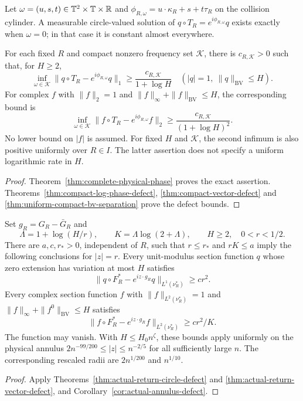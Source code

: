 \begin{maintheorem}
\label{thm:intro-quantitative-phases}
Let $\omega=(u,s,t)\in\mathbb T^2\times\mathbb T\times\mathbb R$ and
$\phi_{R,\omega}=u\cdot\kappa_R+s+t\tau_R$ on the collision cylinder.
A measurable circle-valued solution of
$q\circ T_R=e^{i\phi_{R,\omega}}q$ exists exactly when $\omega=0$;
in that case it is constant almost everywhere.

For each fixed $R$ and compact nonzero frequency set $\mathcal K$,
there is $c_{R,\mathcal K}>0$ such that, for $H\ge2$,
\[
 \inf_{\omega\in\mathcal K}
 \|q\circ T_R-e^{i\phi_{R,\omega}}q\|_1
                  \ge\frac{c_{R,\mathcal K}}{1+\log H}
 \quad (|q|=1,\ \|q\|_{\mathrm{BV}}\le H).
\]
For complex $f$ with $\|f\|_2=1$ and
$\|f\|_\infty+\|f\|_{\mathrm{BV}}\le H$, the corresponding bound is
\[
 \inf_{\omega\in\mathcal K}
 \|f\circ T_R-e^{i\phi_{R,\omega}}f\|_2
                  \ge\frac{c_{R,\mathcal K}}{(1+\log H)^2}.
\]
No lower bound on $|f|$ is assumed. For fixed $H$ and $\mathcal K$,
the second infimum is also positive uniformly over $R\in I$.
The latter assertion does not specify a uniform logarithmic rate in $H$.
\end{maintheorem}
\begin{proof}
Theorem~\ref{thm:complete-physical-phase} proves the exact assertion.
Theorems~\ref{thm:compact-log-phase-defect},
\ref{thm:compact-vector-defect} and
\ref{thm:uniform-compact-bv-separation} prove the defect bounds.
\end{proof}

\begin{maintheorem}
\label{thm:intro-actual-return-defects}
Set $g_R=G_R-\bar G_R$ and
\[
 \Lambda=1+\log(H/r),\qquad K=\Lambda\log(2+\Lambda),
                 \qquad H\ge2,\quad 0<r<1/2.
\]
There are $a,c,r_*>0$, independent of $R$, such that $r\le r_*$
and $rK\le a$ imply the following conclusions for $|z|=r$.
Every unit-modulus section function $q$ whose zero extension has
variation at most $H$ satisfies
\[
 \|q\circ F_R^*-e^{iz\cdot g_R}q\|_{L^1(\nu_R^*)}\ge cr^2.
\]
Every complex section function $f$ with
$\|f\|_{L^2(\nu_R^*)}=1$ and
$\|f\|_\infty+\|f^0\|_{\mathrm{BV}}\le H$ satisfies
\[
 \|f\circ F_R^*-e^{iz\cdot g_R}f\|_{L^2(\nu_R^*)}
                                    \ge cr^2/K.
\]
The function may vanish. With $H\le H_0n^\zeta$, these bounds apply
uniformly on the physical annulus
$2n^{-99/200}\le|z|\le n^{-2/5}$ for all sufficiently large $n$.
The corresponding rescaled radii are $2n^{1/200}$ and $n^{1/10}$.
\end{maintheorem}
\begin{proof}
Apply Theorems~\ref{thm:actual-return-circle-defect} and
\ref{thm:actual-return-vector-defect}, and
Corollary~\ref{cor:actual-annulus-defect}.
\end{proof}
